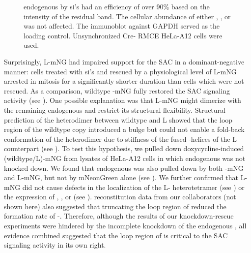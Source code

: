 \begin{figure}
endogenous  by si's had an efficiency of over 90\% based on the intensity of the residual  band. The cellular abundance of either , , or  was not affected. The immunoblot against GAPDH served as the loading control. Unsynchronized Cre- RMCE HeLa-A12 cells were used.
\end{figure}

Surprisingly, \textDelta{}L-mNG had impaired support for the SAC in a dominant-negative manner: cells treated with si's and rescued by a physiological level of \textDelta{}L-mNG arrested in mitosis for a significantly shorter duration than cells which were not rescued. As a comparison, wildtype -mNG fully restored the SAC signaling activity (see ). One possible explanation was that \textDelta{}L-mNG might dimerize with the remaining endogenous  and restrict its structural flexibility. Structural prediction of the heterodimer between wildtype  and \textDelta{}L showed that the loop region of the wildtype copy introduced a bulge but could not enable a fold-back conformation of the heterodimer due to stiffness of the fused \textalpha{}-helices of the \textDelta{}L counterpart (see ). To test this hypothesis, we pulled down doxycycline-induced (wildtype/\textDelta{}L)-mNG from lysates of HeLa-A12 cells in which endogenous  was not knocked down. We found that endogenous  was also pulled down by both -mNG and \textDelta{}L-mNG, but not by mNeonGreen alone (see ). We further confirmed that \textDelta{}L-mNG did not cause defects in the localization of the \textDelta{}L- heterotetramer (see ) or the expression of , , or  (see ).  reconstitution data from our collaborators (not shown here) also suggested that truncating the loop region of  reduced the formation rate of -. Therefore, although the results of our knockdown-rescue experiments were hindered by the incomplete knockdown of the endogenous , all evidence combined suggested that the loop region of  is critical to the SAC signaling activity in its own right.

